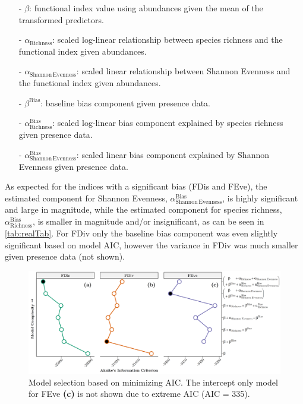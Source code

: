 \documentclass[
  10pt,
]{article}
\begin{document}
\begin{enumerate}
  \itemsep0em 
  \item[-] $\beta$: functional index value using abundances given the mean of the transformed predictors.
  \item[-] $\alpha_\mathrm{Richness}$: scaled log-linear relationship between species richness and the functional index given abundances.
  \item[-] $\alpha_\mathrm{Shannon\,Evenness}$: scaled linear relationship between Shannon Evenness and the functional index given abundances.
  \item[-] $\beta^\mathrm{Bias}$: baseline bias component given presence data.
  \item[-] $\alpha^\mathrm{Bias}_\mathrm{Richness}$: scaled log-linear bias component explained by species richness given presence data.
  \item[-] $\alpha^\mathrm{Bias}_\mathrm{Shannon\,Evenness}$: scaled linear bias component explained by Shannon Evenness given presence data.
\end{enumerate}

As expected for the indices with a significant bias (FDis and FEve), the estimated component for Shannon Evenness, \(\alpha^\mathrm{Bias}_\mathrm{Shannon\,Evenness}\), is highly significant and large in magnitude, while the estimated component for species richness, \(\alpha^\mathrm{Bias}_\mathrm{Richness}\), is smaller in magnitude and/or insignificant, as can be seen in \autoref{tab:realTab}. For FDiv only the baseline bias component was even slightly significant based on model AIC, however the variance in FDiv was much smaller given presence data (not shown).

\setlength{\intextsep}{\oldintextsep}

\begin{figure}
  \centering
  \includegraphics[width=\textwidth]{../Final Visualizations/finalModelAIC.png}
  \caption{Model selection based on minimizing AIC. The intercept only model for FEve \textbf{(c)} is not shown due to extreme AIC (AIC = 335).}
  \label{fig:modelAIC}
\end{figure}
\end{document}
